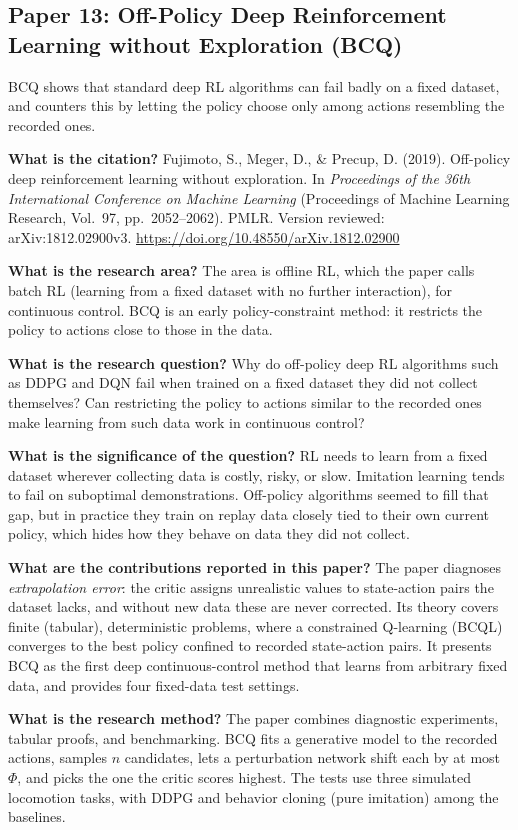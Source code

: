 \documentclass[11pt]{article}
\newcommand{\paper}[1]{\subsection*{#1}}
\newcommand{\q}[2]{\item \textbf{#1} #2}
\begin{document}
\paper{Paper 13: Off-Policy Deep Reinforcement Learning without Exploration (BCQ)}
BCQ shows that standard deep RL algorithms can fail badly on a fixed dataset, and counters this by letting the policy choose only among actions resembling the recorded ones.
\begin{qna}

\q{What is the citation?}
Fujimoto, S., Meger, D., \& Precup, D. (2019). Off-policy deep reinforcement learning without exploration. In \emph{Proceedings of the 36th International Conference on Machine Learning} (Proceedings of Machine Learning Research, Vol.\ 97, pp.\ 2052--2062). PMLR. Version reviewed: arXiv:1812.02900v3. \url{https://doi.org/10.48550/arXiv.1812.02900}

\q{What is the research area?}
The area is offline RL, which the paper calls batch RL (learning from a fixed dataset with no further interaction), for continuous control. BCQ is an early policy-constraint method: it restricts the policy to actions close to those in the data.

\q{What is the research question?}
Why do off-policy deep RL algorithms such as DDPG and DQN fail when trained on a fixed dataset they did not collect themselves? Can restricting the policy to actions similar to the recorded ones make learning from such data work in continuous control?

\q{What is the significance of the question?}
RL needs to learn from a fixed dataset wherever collecting data is costly, risky, or slow. Imitation learning tends to fail on suboptimal demonstrations. Off-policy algorithms seemed to fill that gap, but in practice they train on replay data closely tied to their own current policy, which hides how they behave on data they did not collect.

\q{What are the contributions reported in this paper?}
The paper diagnoses \emph{extrapolation error}: the critic assigns unrealistic values to state-action pairs the dataset lacks, and without new data these are never corrected. Its theory covers finite (tabular), deterministic problems, where a constrained Q-learning (BCQL) converges to the best policy confined to recorded state-action pairs. It presents BCQ as the first deep continuous-control method that learns from arbitrary fixed data, and provides four fixed-data test settings.

\q{What is the research method?}
The paper combines diagnostic experiments, tabular proofs, and benchmarking. BCQ fits a generative model to the recorded actions, samples $n$ candidates, lets a perturbation network shift each by at most $\Phi$, and picks the one the critic scores highest. The tests use three simulated locomotion tasks, with DDPG and behavior cloning (pure imitation) among the baselines.


\end{qna}
\end{document}
